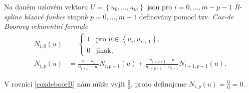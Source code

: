\begin{definice}
	Na daném uzlovém vektoru $U=\left\{u_0,\dots,u_m\right\}$ jsou pro $i=0,\dots,m-p-1$ \emph{B-spline bázové funkce} stupně $p=0,\dots,m-1$ definovány  pomocí tzv. \emph{Cox-de Boorovy rekurentní formule}
	\begin{subequations}\label{coxdeboor}
		\begin{align}
			N_{i,0}\left(u\right)&=
			\begin{cases}
				1 & \text{pro $u\in\left\langle u_i,u_{i+1} \right)$},\\
				0 & \text{jinak},
			\end{cases}\label{coxdeboorA}\\
			N_{i,p}\left(u\right)&=\frac{u-u_i}{u_{i+p}-u_i}N_{i,p-1}\left(u\right)+\frac{u_{i+p+1}-u}{u_{i+p+1}-u_{i+1}}N_{i+1,p-1}\left(u\right).\label{coxdeboorB}
		\end{align}
	\end{subequations}
\end{definice}

\begin{poznamka}
	V rovnici \eqref{coxdeboorB} nám může vyjít $\frac{0}{0}$, proto definujeme $N_{i,p}\left(u\right)=\frac{0}{0}=0$.
\end{poznamka}

